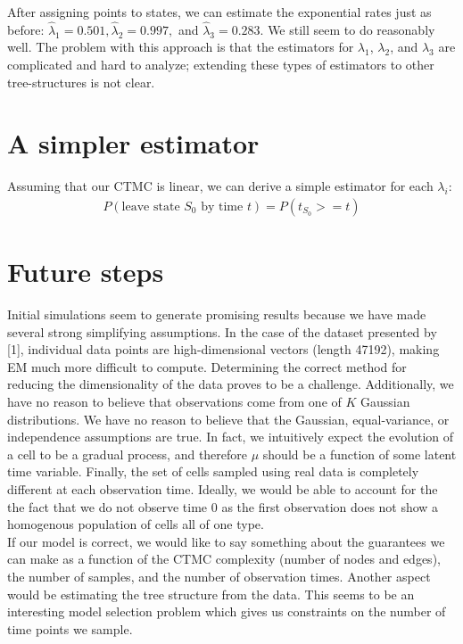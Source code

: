 \documentclass[11pt,onecolumn]{article}
\begin{document}
After assigning points to states, we can estimate the exponential rates just as before: $\hat{\lambda}_1 = 0.501, \hat{\lambda}_2 = 0.997,$ and $\hat{\lambda}_3 = 0.283$. We still seem to do reasonably well. The problem with this approach is that the estimators for $\lambda_1$, $\lambda_2$, and $\lambda_3$ are complicated and hard to analyze; extending these types of estimators to other tree-structures is not clear.

\section{A simpler estimator}
Assuming that our CTMC is linear, we can derive a simple estimator for each $\lambda_i$: 
\begin{align*}
	P(\mbox{leave state $S_0$ by time $t$}) = P(t_{S_0} >= t)
\end{align*}

\section{Future steps}
Initial simulations seem to generate promising results because we have made several strong simplifying assumptions. In the case of the dataset presented by [1], individual data points are high-dimensional vectors (length 47192), making EM much more difficult to compute. Determining the correct method for reducing the dimensionality of the data proves to be a challenge. Additionally, we have no reason to believe that observations come from one of $K$ Gaussian distributions. We have no reason to believe that the Gaussian, equal-variance, or independence assumptions are true. In fact, we intuitively expect the evolution of a cell to be a gradual process, and therefore $\mu$ should be a function of some latent time variable. Finally, the set of cells sampled using real data is completely different at each observation time. Ideally, we would be able to account for the the fact that we do not observe time 0 as the first observation does not show a homogenous population of cells all of one type. \\

If our model is correct, we would like to say something about the guarantees we can make as a function of the CTMC complexity (number of nodes and edges), the number of samples, and the number of observation times. Another aspect would  be estimating the tree structure from the data. This seems to be an interesting model selection problem which gives us constraints on the number of time points we sample.
\end{document}
